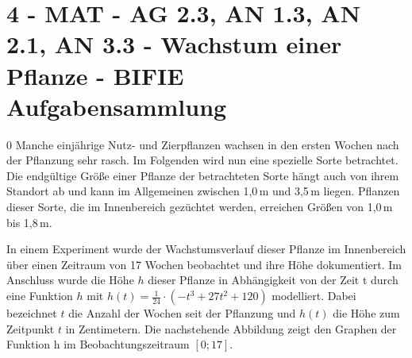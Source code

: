 \section{4 - MAT - AG 2.3, AN 1.3, AN 2.1, AN 3.3 - Wachstum einer Pflanze - BIFIE Aufgabensammlung}

\begin{langesbeispiel} \item[0] %
Manche einjährige Nutz- und Zierpflanzen wachsen in den ersten Wochen nach der Pflanzung sehr rasch. Im Folgenden wird nun eine spezielle Sorte betrachtet. Die endgültige Größe einer
Pflanze der betrachteten Sorte hängt auch von ihrem Standort ab und kann im Allgemeinen zwischen 1,0\,m und 3,5\,m liegen. Pflanzen dieser Sorte, die im Innenbereich gezüchtet werden,
erreichen Größen von 1,0\,m bis 1,8\,m. 

In einem Experiment wurde der Wachstumsverlauf dieser Pflanze im Innenbereich über einen Zeitraum von 17 Wochen beobachtet und ihre Höhe dokumentiert. Im Anschluss wurde die
Höhe $h$ dieser Pflanze in Abhängigkeit von der Zeit t durch eine Funktion $h$ mit $h(t) = \frac{1}{24}\cdot \left(-t^3+27t^2+120\right)$ modelliert. Dabei bezeichnet $t$ die Anzahl der Wochen seit der Pflanzung und $h(t)$ die Höhe zum Zeitpunkt $t$ in Zentimetern. Die nachstehende Abbildung zeigt den Graphen der Funktion h im Beobachtungszeitraum $[0; 17]$.

\begin{center}
\end{center}%


\end{langesbeispiel}
